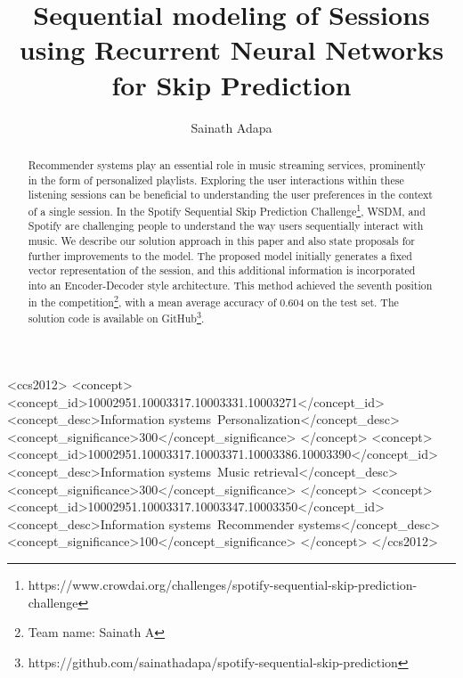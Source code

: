 \documentclass[sigconf]{acmart}
\begin{document}
%
\title{Sequential modeling of Sessions using Recurrent Neural Networks for Skip Prediction}

%
\author{Sainath Adapa}

%

%
\begin{abstract}
Recommender systems play an essential role in music streaming services, prominently in the form of personalized playlists. Exploring the user interactions within these listening sessions can be beneficial to understanding the user preferences in the context of a single session. In the Spotify Sequential Skip Prediction Challenge\footnote{https://www.crowdai.org/challenges/spotify-sequential-skip-prediction-challenge}, WSDM, and Spotify are challenging people to understand the way users sequentially interact with music. We describe our solution approach in this paper and also state proposals for further improvements to the model. The proposed model initially generates a fixed vector representation of the session, and this additional information is incorporated into an Encoder-Decoder style architecture. This method achieved the seventh position in the competition\footnote{Team name: Sainath A}, with a mean average accuracy of 0.604 on the test set. The solution code is available on GitHub\footnote{https://github.com/sainathadapa/spotify-sequential-skip-prediction}.
\end{abstract}

\begin{CCSXML}
<ccs2012>
<concept>
<concept_id>10002951.10003317.10003331.10003271</concept_id>
<concept_desc>Information systems~Personalization</concept_desc>
<concept_significance>300</concept_significance>
</concept>
<concept>
<concept_id>10002951.10003317.10003371.10003386.10003390</concept_id>
<concept_desc>Information systems~Music retrieval</concept_desc>
<concept_significance>300</concept_significance>
</concept>
<concept>
<concept_id>10002951.10003317.10003347.10003350</concept_id>
<concept_desc>Information systems~Recommender systems</concept_desc>
<concept_significance>100</concept_significance>
</concept>
</ccs2012>
\end{CCSXML}
\end{document}
